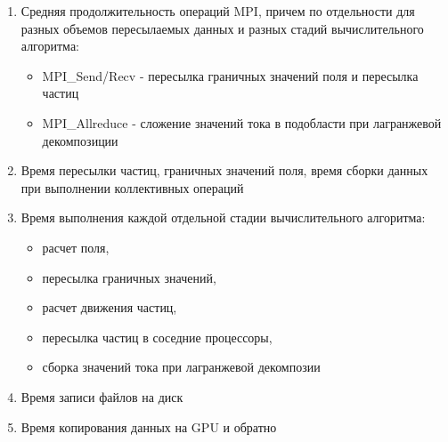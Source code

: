 \begin{enumerate}
	\item Средняя продолжительность операций MPI, причем по отдельности для разных объемов пересылаемых данных и разных стадий вычислительного алгоритма:
	\begin{itemize}
		\item MPI\_Send/Recv - пересылка граничных значений поля и пересылка частиц
		\item MPI\_Allreduce - сложение значений тока в подобласти при лагранжевой декомпозиции
		
	\end{itemize}	
	\item Время пересылки частиц, граничных значений поля, время сборки данных при выполнении коллективных операций   
	\item Время выполнения каждой отдельной стадии вычислительного алгоритма:
	\begin{itemize}
		\item расчет поля, 
		\item пересылка граничных значений, 
		\item расчет движения частиц, 
		\item пересылка частиц в соседние процессоры, 
		\item сборка значений тока при лагранжевой декомпозии
	\end{itemize}
	\item Время записи файлов на диск 
	\item Время копирования данных на GPU и обратно
	
\end{enumerate}

